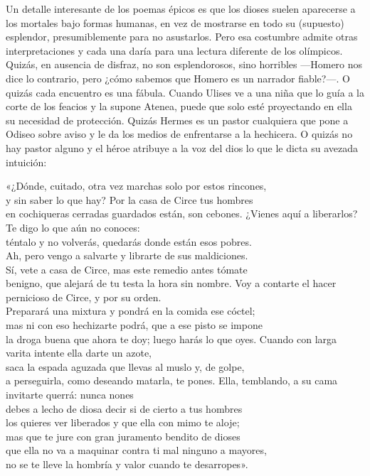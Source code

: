 Un detalle interesante de los poemas épicos es que los dioses suelen aparecerse a los mortales bajo formas humanas, en vez de mostrarse en todo su (supuesto) esplendor, presumiblemente para no asustarlos. Pero esa costumbre admite otras interpretaciones y cada una daría para una lectura diferente de los olímpicos. Quizás, en ausencia de disfraz, no son esplendorosos, sino horribles ---Homero nos dice lo contrario, pero ¿cómo sabemos que Homero es un narrador fiable?---. O quizás cada encuentro es una fábula. Cuando Ulises ve a una niña que lo guía a la corte de los feacios y la supone Atenea, puede que solo esté proyectando en ella su necesidad de protección. Quizás Hermes es un pastor cualquiera que pone a Odiseo sobre aviso y le da los medios de enfrentarse a la hechicera. O quizás no hay pastor alguno y el héroe atribuye a la voz del dios lo que le dicta su avezada intuición:

\begin{versocita}
«¿Dónde, cuitado, otra vez marchas solo por estos rincones,\\
y sin saber lo que hay? Por la casa de Circe tus hombres\\
en cochiqueras cerradas guardados están, son cebones.
\stanzabreak
¿Vienes aquí a liberarlos? Te digo lo que aún no conoces:\\
téntalo y no volverás, quedarás donde están esos pobres.\\
Ah, pero vengo a salvarte y librarte de sus maldiciones.\\
Sí, vete a casa de Circe, mas este remedio antes tómate\\
benigno, que alejará de tu testa la hora sin nombre.
\stanzabreak
Voy a contarte el hacer pernicioso de Circe, y por su orden.\\
Preparará una mixtura y pondrá en la comida ese cóctel;\\
mas ni con eso hechizarte podrá, que a ese pisto se impone\\
la droga buena que ahora te doy; luego harás lo que oyes.
\stanzabreak
Cuando con larga varita intente ella darte un azote,\\
saca la espada aguzada que llevas al muslo y, de golpe,\\
a perseguirla, como deseando matarla, te pones.
\stanzabreak
Ella, temblando, a su cama invitarte querrá: nunca nones\\
debes a lecho de diosa decir si de cierto a tus hombres\\
los quieres ver liberados y que ella con mimo te aloje;\\
mas que te jure con gran juramento bendito de dioses\\
que ella no va a maquinar contra ti mal ninguno a mayores,\\
no se te lleve la hombría y valor cuando te desarropes».
\end{versocita}


